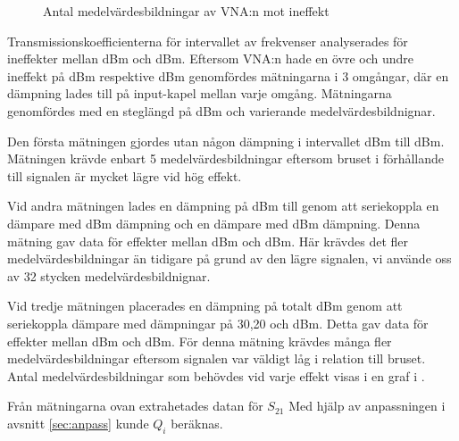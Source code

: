 \documentclass[main.tex]{subfiles}
\begin{document}
\begin{figure}
    \centering
    \setlength{}
    \setlength\figureheight{7em}
    
    \caption{Antal medelvärdesbildningar av VNA:n mot ineffekt}
    \label{fig:medel}
\end{figure}

Transmissionskoefficienterna för intervallet av frekvenser analyserades för ineffekter mellan \unit[8]{dBm} och \unit[-83]{dBm}. Eftersom VNA:n hade en övre och undre ineffekt på \unit[8]{dBm} respektive \unit[-27]{dBm} genomfördes mätningarna i 3 omgångar, där en dämpning lades till på input-kapel mellan varje omgång. Mätningarna genomfördes med en steglängd på \unit[2,5]{dBm} och varierande medelvärdesbildnignar. 

Den första mätningen gjordes utan någon dämpning i intervallet \unit[8]{dBm} till \unit[-27]{dBm}. Mätningen krävde enbart 5 medelvärdesbildningar eftersom bruset i förhållande till signalen är mycket lägre vid hög effekt.

Vid andra mätningen lades en dämpning på \unit[30]{dBm} till genom att seriekoppla en dämpare med \unit[20]{dBm} dämpning och en dämpare med \unit[10]{dBm} dämpning. Denna mätning gav data för effekter mellan \unit[-22]{dBm} och \unit[-52]{dBm}. Här krävdes det fler medelvärdesbildningar än tidigare på grund av den lägre signalen, vi använde oss av 32 stycken medelvärdesbildnignar. 

Vid tredje mätningen placerades en dämpning på totalt \unit[56]{dBm} genom att seriekoppla dämpare med dämpningar på 30,20 och \unit[6]{dBm}. Detta gav data för effekter mellan \unit[-44]{dBm} och \unit[-83]{dBm}. För denna mätning krävdes många fler medelvärdesbildningar eftersom signalen var väldigt låg i relation till  bruset. Antal medelvärdesbildningar som behövdes vid varje effekt visas i en graf i .

Från mätningarna ovan extrahetades datan för $S_{21}$ Med hjälp av anpassningen i avsnitt \ref{sec:anpass} kunde $Q_i$ beräknas.

\end{document}

